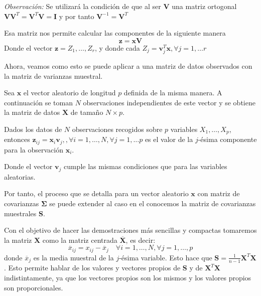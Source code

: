 \noindent \emph{Observación: }Se utilizará la condición de que al ser $\mathbf{V}$ una matriz ortogonal $\mathbf{VV}^T=\mathbf{V}^T\mathbf{V}=\mathbf{I}$ y por tanto $\mathbf{V}^{-1}=\mathbf{V}^T$

\noindent Esa matriz nos permite calcular las componentes de la siguiente manera
\begin{equation}
\mathbf{z}=\mathbf{x} \mathbf{V}
\end{equation} 
\noindent Donde el vector $\mathbf{z}=Z_1,\ldots, Z_r$, y donde cada $Z_j=\mathbf{v}_j^T\mathbf{x}, \forall j=1,\ldots r$

\noindent Ahora, veamos como esto se puede aplicar a una matriz de datos observados con la matriz de varianzas muestral.

\noindent Sea $\mathbf{x}$ el vector aleatorio de longitud $p$ definida de la misma manera. A continuación se toman $N$ observaciones independientes de este vector y se obtiene la matriz de datos $\mathbf{X}$ de tamaño $N\times p$. 

\begin{defi}
Dados los datos de $N$ observaciones recogidos sobre $p$ variables $X_1,\ldots, X_p$, entonces $\mathbf{z}_{ij}=\mathbf{x}_i\mathbf{v}_j, ,\forall i=1,\ldots, N,\forall j=1,\ldots p$ es el valor de la $j$-ésima componente para la observación $\mathbf{x}_i$. 

\noindent Donde el vector $\mathbf{v}_j$ cumple las mismas condiciones que para las variables aleatorias. 
\end{defi}

\noindent Por tanto, el proceso que se detalla para un vector aleatorio $\mathbf{x}$ con matriz de covarianzas $\mathbf{\Sigma}$ se puede extender al caso en el conocemos la matriz de covarianzas muestrales \textbf{S}.

\noindent Con el objetivo de hacer las demostraciones más sencillas y compactas tomaremos la matriz $\textbf{X}$ como la matriz centrada $\overline{\textbf{X}}$, es decir: 
\begin{equation}
\overline{x}_{ij}=x_{ij}-\overline{x}_j \quad \forall i=1,\ldots,N,\forall j=1,\ldots,p
\end{equation}
donde $\overline{x}_j$ es la media muestral de la $j$-ésima variable. Esto hace que $\textbf{S}=\frac{1}{n-1}\textbf{X}^T\textbf{X}$. Esto permite hablar de los valores y vectores propios de \textbf{S} y de $\textbf{X}^T \textbf{X}$ indistintamente, ya que los vectores propios son los mismos y los valores propios son proporcionales. 


